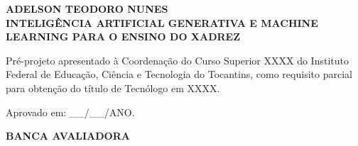 \begin{folhadeaprovacao}


\begin{center}

    {\normalsize\textbf{ADELSON TEODORO NUNES}\\}
    \vspace{1cm}
    {\normalsize\bfseries{INTELIGÊNCIA ARTIFICIAL GENERATIVA E MACHINE LEARNING PARA O ENSINO DO XADREZ}\\}
    \vspace{1cm}
    \hspace{.45\linewidth}
    \begin{minipage}{.50\linewidth}

            Pré-projeto apresentado à Coordenação do Curso Superior XXXX do Instituto Federal de Educação, Ciência e Tecnologia do Tocantins, como requisito parcial para obtenção do título de Tecnólogo em XXXX.
    \end{minipage}
\end{center}
\vspace{0.75cm}
{\normalsize{Aprovado em: \_\_/\_\_/ANO.}}
\vspace{0.75cm}
	
    \begin{center}
        \textbf{BANCA AVALIADORA}
    \end{center}

   

\end{folhadeaprovacao}